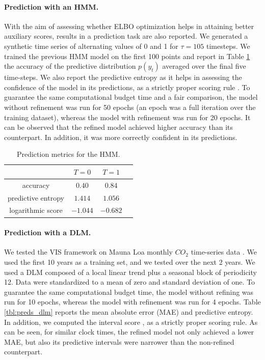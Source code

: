 \paragraph{Prediction with an HMM.} 
With the aim of assessing whether ELBO optimization helps in attaining better auxiliary scores, results in a prediction task are also reported. We generated a synthetic time series of alternating values of 0 and 1 for $\tau=105$ timesteps. We trained the previous HMM model on the first 100 points and report in Table \ref{tbl:preds} the accuracy of the predictive distribution $p(y_t)$ averaged over the final five time-steps. We also report the predictive entropy as it helps in assessing the confidence of the model in its predictions, as a strictly proper scoring rule \cite{gneiting2007strictly}. To guarantee the same computational budget time and a fair comparison, the model without refinement was run for 50 epochs (an epoch was a full iteration over the training dataset), whereas the model with refinement was run for 20 epochs. It can be observed that the refined model achieved higher accuracy than its counterpart. In addition,
it was more correctly confident in its predictions.
\begin{table}[!h]

\caption{Prediction metrics for the HMM.}\label{tbl:preds}
\begin{tabular}{c@{\hskip 1.2in}c@{\hskip 1.1in}c@{\hskip 1in}c}
\toprule
   & ${T=0}$                             & ${T=1}$   \\ 
 \midrule
    accuracy          & $0.40$ &  $0.84$ \\
    predictive entropy          & $1.414$ &  $1.056$ \\
    logarithmic score   & $-1.044$ & $-0.682$ \\
 \bottomrule
\end{tabular}
\end{table}

\paragraph{Prediction with a DLM.}

We tested the VIS framework on Mauna Loa monthly $CO_2$ time-series data \cite{keeling2005atmospheric}. We used the first 10 years as a training set, and we tested over the next 2 years. We used a DLM composed of a local linear trend plus a seasonal block of periodicity 12. %
Data were standardized %
to {a mean of zero and standard deviation of one}. To guarantee the same computational budget time, the model without refining was run for 10 epochs, whereas the model with refinement was run for 4 epochs.  Table \ref{tbl:preds_dlm}
reports the mean absolute error (MAE) and predictive entropy. 
In addition, we computed the interval score 
 \cite{gneiting2007strictly}, as a strictly proper scoring rule. As can be seen, for similar clock times, the refined model not only achieved a lower MAE, but also its predictive intervals were narrower than the non-refined counterpart. 

